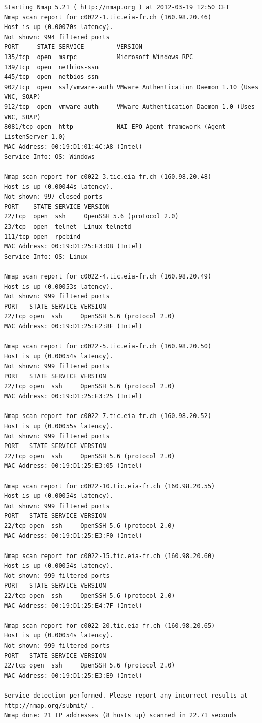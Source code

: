 \documentclass[10pt,a4paper,twoside,onecolumn]{article}
\begin{document}
\begin{lstlisting}
Starting Nmap 5.21 ( http://nmap.org ) at 2012-03-19 12:50 CET
Nmap scan report for c0022-1.tic.eia-fr.ch (160.98.20.46)
Host is up (0.00070s latency).
Not shown: 994 filtered ports
PORT     STATE SERVICE         VERSION
135/tcp  open  msrpc           Microsoft Windows RPC
139/tcp  open  netbios-ssn
445/tcp  open  netbios-ssn
902/tcp  open  ssl/vmware-auth VMware Authentication Daemon 1.10 (Uses VNC, SOAP)
912/tcp  open  vmware-auth     VMware Authentication Daemon 1.0 (Uses VNC, SOAP)
8081/tcp open  http            NAI EPO Agent framework (Agent ListenServer 1.0)
MAC Address: 00:19:D1:01:4C:A8 (Intel)
Service Info: OS: Windows

Nmap scan report for c0022-3.tic.eia-fr.ch (160.98.20.48)
Host is up (0.00044s latency).
Not shown: 997 closed ports
PORT    STATE SERVICE VERSION
22/tcp  open  ssh     OpenSSH 5.6 (protocol 2.0)
23/tcp  open  telnet  Linux telnetd
111/tcp open  rpcbind
MAC Address: 00:19:D1:25:E3:DB (Intel)
Service Info: OS: Linux

Nmap scan report for c0022-4.tic.eia-fr.ch (160.98.20.49)
Host is up (0.00053s latency).
Not shown: 999 filtered ports
PORT   STATE SERVICE VERSION
22/tcp open  ssh     OpenSSH 5.6 (protocol 2.0)
MAC Address: 00:19:D1:25:E2:8F (Intel)

Nmap scan report for c0022-5.tic.eia-fr.ch (160.98.20.50)
Host is up (0.00054s latency).
Not shown: 999 filtered ports
PORT   STATE SERVICE VERSION
22/tcp open  ssh     OpenSSH 5.6 (protocol 2.0)
MAC Address: 00:19:D1:25:E3:25 (Intel)

Nmap scan report for c0022-7.tic.eia-fr.ch (160.98.20.52)
Host is up (0.00055s latency).
Not shown: 999 filtered ports
PORT   STATE SERVICE VERSION
22/tcp open  ssh     OpenSSH 5.6 (protocol 2.0)
MAC Address: 00:19:D1:25:E3:05 (Intel)

Nmap scan report for c0022-10.tic.eia-fr.ch (160.98.20.55)
Host is up (0.00054s latency).
Not shown: 999 filtered ports
PORT   STATE SERVICE VERSION
22/tcp open  ssh     OpenSSH 5.6 (protocol 2.0)
MAC Address: 00:19:D1:25:E3:F0 (Intel)

Nmap scan report for c0022-15.tic.eia-fr.ch (160.98.20.60)
Host is up (0.00054s latency).
Not shown: 999 filtered ports
PORT   STATE SERVICE VERSION
22/tcp open  ssh     OpenSSH 5.6 (protocol 2.0)
MAC Address: 00:19:D1:25:E4:7F (Intel)

Nmap scan report for c0022-20.tic.eia-fr.ch (160.98.20.65)
Host is up (0.00054s latency).
Not shown: 999 filtered ports
PORT   STATE SERVICE VERSION
22/tcp open  ssh     OpenSSH 5.6 (protocol 2.0)
MAC Address: 00:19:D1:25:E3:E9 (Intel)

Service detection performed. Please report any incorrect results at http://nmap.org/submit/ .
Nmap done: 21 IP addresses (8 hosts up) scanned in 22.71 seconds
\end{lstlisting}
\end{document}
